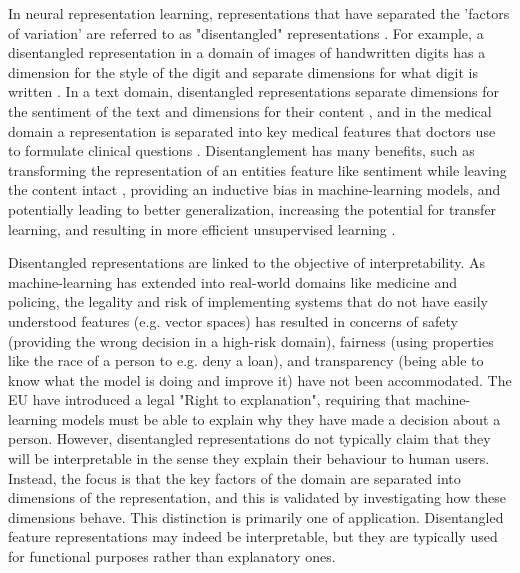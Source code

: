 In neural representation learning, representations that have separated the 'factors of variation' are referred to as "disentangled" representations \cite{Bengio2012}. For example, a disentangled representation in a domain of images of handwritten digits  has a  dimension for the style of the digit  and separate dimensions for what digit is written   \cite{Chen2016}. In a text domain, disentangled representations separate dimensions for the sentiment of the text and dimensions for their content    \cite{John2019}, and in the medical domain a representation is separated into key medical features that doctors use to formulate clinical questions \cite{Banner}. Disentanglement has many benefits, such as transforming the representation of an entities feature like sentiment while leaving the content intact \cite{Larsson2017}, providing an inductive bias in machine-learning models, and potentially leading to better generalization, increasing the potential for transfer learning, and resulting in more efficient unsupervised learning  \cite{Banner}  \cite{Paige2016}.   

Disentangled representations  are linked to the objective of interpretability. As machine-learning has extended into  real-world domains like medicine and policing,  the legality and risk of implementing systems that do not have easily understood features (e.g. vector spaces) has resulted in concerns of safety (providing the wrong decision in a high-risk domain), fairness (using properties like  the race of a person to e.g. deny a loan), and transparency (being able to know what the model is doing and improve it) have not been accommodated. The EU have introduced a legal "Right to explanation", requiring that machine-learning models must be able to explain why they have made a decision about a person. However,  disentangled representations do not typically claim that they will be interpretable in the sense  they explain their behaviour to human users. Instead, the focus is that the key factors of the domain are separated into dimensions of the representation,  and this is validated by investigating how these dimensions behave. This distinction is primarily one of application. Disentangled feature representations may indeed be interpretable, but they are typically used for functional purposes rather than explanatory ones.



